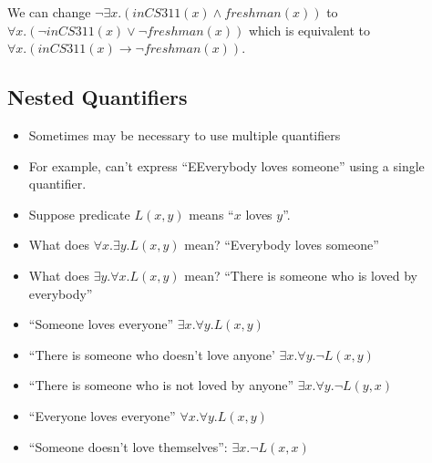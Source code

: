 \documentclass{scrreprt}
\begin{document}
\begin{example}
	We can change $\neg \exists x.(inCS311(x)\land freshman(x))$ to
	$\forall x.(\neg inCS311(x)\lor \neg freshman(x))$ which is equivalent to
	$\forall x.(inCS311(x)\rightarrow \neg freshman(x))$.
\end{example}

\subsection{Nested Quantifiers}
\begin{itemize}
	\item Sometimes may be necessary to use multiple quantifiers
	\item For example, can't express ``EEverybody loves someone'' using a single quantifier.
	\item Suppose predicate $L(x, y)$ means ``$x$ loves $y$''.
	\item What does $\forall x.\exists y.L(x, y)$ mean? ``Everybody loves someone''
	\item What does $\exists y.\forall x.L(x, y)$ mean? ``There is someone who is loved by everybody''
\end{itemize}

\begin{example}
	\begin{itemize}
		\item ``Someone loves everyone'' $\exists x.\forall y.L(x, y)$
		\item ``There is someone who doesn't love anyone' $\exists x.\forall y.\neg L(x, y)$
		\item ``There is someone who is not loved by anyone'' $\exists x.\forall y. \neg L(y, x)$
		\item ``Everyone loves everyone'' $\forall x.\forall y.L(x, y)$
		\item ``Someone doesn't love themselves'': $\exists x.\neg L(x, x)$
	\end{itemize}
\end{example}
\end{document}
